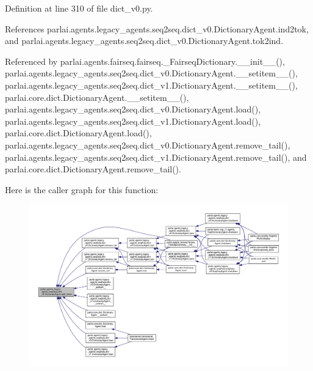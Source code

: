 Definition at line 310 of file dict\+\_\+v0.\+py.



References parlai.\+agents.\+legacy\+\_\+agents.\+seq2seq.\+dict\+\_\+v0.\+Dictionary\+Agent.\+ind2tok, and parlai.\+agents.\+legacy\+\_\+agents.\+seq2seq.\+dict\+\_\+v0.\+Dictionary\+Agent.\+tok2ind.



Referenced by parlai.\+agents.\+fairseq.\+fairseq.\+\_\+\+Fairseq\+Dictionary.\+\_\+\+\_\+init\+\_\+\+\_\+(), parlai.\+agents.\+legacy\+\_\+agents.\+seq2seq.\+dict\+\_\+v0.\+Dictionary\+Agent.\+\_\+\+\_\+setitem\+\_\+\+\_\+(), parlai.\+agents.\+legacy\+\_\+agents.\+seq2seq.\+dict\+\_\+v1.\+Dictionary\+Agent.\+\_\+\+\_\+setitem\+\_\+\+\_\+(), parlai.\+core.\+dict.\+Dictionary\+Agent.\+\_\+\+\_\+setitem\+\_\+\+\_\+(), parlai.\+agents.\+legacy\+\_\+agents.\+seq2seq.\+dict\+\_\+v0.\+Dictionary\+Agent.\+load(), parlai.\+agents.\+legacy\+\_\+agents.\+seq2seq.\+dict\+\_\+v1.\+Dictionary\+Agent.\+load(), parlai.\+core.\+dict.\+Dictionary\+Agent.\+load(), parlai.\+agents.\+legacy\+\_\+agents.\+seq2seq.\+dict\+\_\+v0.\+Dictionary\+Agent.\+remove\+\_\+tail(), parlai.\+agents.\+legacy\+\_\+agents.\+seq2seq.\+dict\+\_\+v1.\+Dictionary\+Agent.\+remove\+\_\+tail(), and parlai.\+core.\+dict.\+Dictionary\+Agent.\+remove\+\_\+tail().

Here is the caller graph for this function\+:
\nopagebreak
\begin{figure}[H]
\begin{center}
\leavevmode
\includegraphics[width=350pt]{classparlai_1_1agents_1_1legacy__agents_1_1seq2seq_1_1dict__v0_1_1DictionaryAgent_abd9065c5c2862e81e3a1edb221ec7491_icgraph}
\end{center}
\end{figure}
\mbox{\label{classparlai_1_1agents_1_1legacy__agents_1_1seq2seq_1_1dict__v0_1_1DictionaryAgent_a7ccda0fb5cabe49fc68551da6fe03bff}} 
